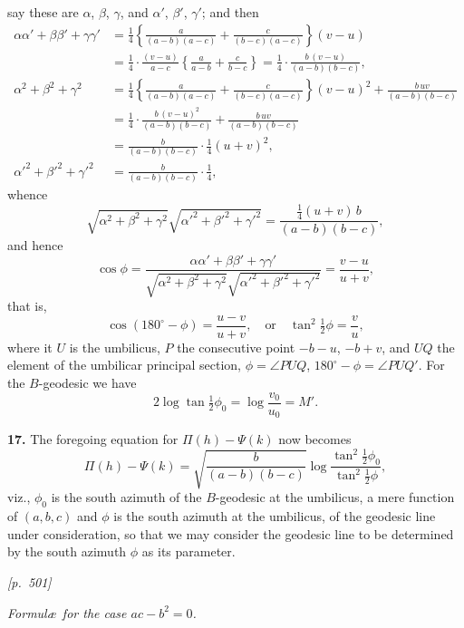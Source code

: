 \documentclass[11pt]{article}
\begin{document}
\noindent
say these are $\alpha$, $\beta$, $\gamma$, and $\alpha'$, $\beta'$, $\gamma'$;
and then
\begin{align*}
\alpha\alpha'+\beta\beta'+\gamma\gamma'
&= \tfrac{1}{4}\!\left\{\frac{a}{(a-b)(a-c)}+\frac{c}{(b-c)(a-c)}\right\}(v-u)\\
&= \tfrac{1}{4}\cdot\frac{(v-u)}{a-c}\left\{\frac{a}{a-b}+\frac{c}{b-c}\right\}
=\tfrac{1}{4}\cdot\frac{b\,(v-u)}{(a-b)(b-c)},\\[4pt]
\alpha^{2}+\beta^{2}+\gamma^{2}
&= \tfrac{1}{4}\!\left\{\frac{a}{(a-b)(a-c)}+\frac{c}{(b-c)(a-c)}\right\}(v-u)^{2}
+\frac{b\,uv}{(a-b)(b-c)}\\
&= \tfrac{1}{4}\cdot\frac{b\,(v-u)^{2}}{(a-b)(b-c)}+\frac{b\,uv}{(a-b)(b-c)}\\
&= \frac{b}{(a-b)(b-c)}\cdot\tfrac{1}{4}(u+v)^{2},\\[4pt]
\alpha'^{2}+\beta'^{2}+\gamma'^{2}
&= \frac{b}{(a-b)(b-c)}\cdot\tfrac{1}{4},
\end{align*}
whence
\[
\sqrt{\alpha^{2}+\beta^{2}+\gamma^{2}}\sqrt{\alpha'^{2}+\beta'^{2}+\gamma'^{2}}
=\frac{\tfrac{1}{4}(u+v)\,b}{(a-b)(b-c)},
\]
and hence
\[
\cos\phi=\frac{\alpha\alpha'+\beta\beta'+\gamma\gamma'}
{\sqrt{\alpha^{2}+\beta^{2}+\gamma^{2}}\sqrt{\alpha'^{2}+\beta'^{2}+\gamma'^{2}}}
=\frac{v-u}{u+v},
\]
that is,
\[
\cos(180^{\circ}-\phi)=\frac{u-v}{u+v},\quad\text{or}\quad
\tan^{2}\tfrac{1}{2}\phi=\frac{v}{u},
\]
where it $U$ is the umbilicus, $P$ the consecutive point $-b-u$,
$-b+v$, and $UQ$ the element of the umbilicar principal section,
$\phi=\angle PUQ$, $180^{\circ}-\phi=\angle PUQ'$. For the
$B$-geodesic we have
\[
2\log\tan\tfrac{1}{2}\phi_{0}=\log\frac{v_{0}}{u_{0}}=M'.
\]

\textbf{17.} The foregoing equation for $\Pi(h)-\Psi(k)$ now becomes
\[
\Pi(h)-\Psi(k)=\sqrt{\frac{b}{(a-b)(b-c)}}\log\frac{\tan^{2}\tfrac{1}{2}\phi_{0}}{\tan^{2}\tfrac{1}{2}\phi},
\]
viz., $\phi_{0}$ is the south azimuth of the $B$-geodesic at the
umbilicus, a mere function of $(a,b,c)$ and $\phi$ is the south azimuth
at the umbilicus, of the geodesic line under consideration, so that we
may consider the geodesic line to be determined by the south azimuth
$\phi$ as its parameter.

\newpage

\noindent\textit{[p.~501]}

\medskip

\begin{center}\textit{Formul\ae\ for the case $ac-b^{2}=0$.}\end{center}
\end{document}
